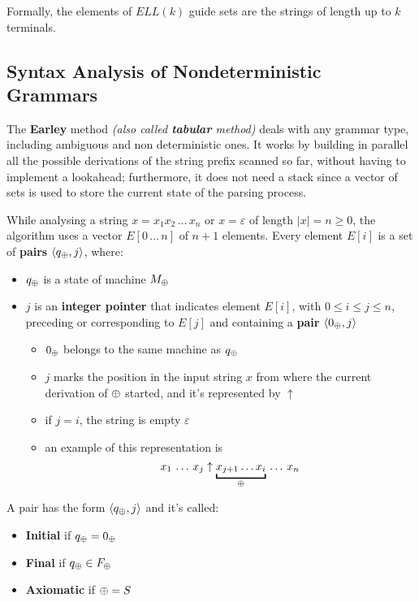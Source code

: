 \documentclass[english]{article}
\begin{document}
Formally, the elements of \(\textit{ELL}(k)\) guide sets are the strings of length up to \(k\) terminals.

\subsection{Syntax Analysis of Nondeterministic Grammars}

The \textbf{Earley} method \textit{(also called \textbf{tabular} method)} deals with any grammar type, including ambiguous and non deterministic ones.
It works by building in parallel all the possible derivations of the string prefix scanned so far, without having to implement a lookahead;
furthermore, it does not need a stack since a vector of sets is used to store the current state of the parsing process.

\bigskip
While analysing a string \(x = x_1 x_2 \,\ldots\, x_n\) or \(x = \varepsilon\) of length \(|x| = n \geq 0\), the algorithm uses a vector \(E\left[ 0 \,\ldots\, n \right]\) of \(n+1\) elements.
Every element \(E[i]\) is a set of \textbf{pairs} \(\langle q_\oplus, j\rangle\), where:

\begin{itemize}
  \item \(q_\oplus\) is a state of machine \(M_\oplus\)
  \item \(j\) is an \textbf{integer pointer} that indicates element \(E[i]\), with \(0 \leq i \leq j \leq n\), preceding or corresponding to \(E[j]\) and containing a \textbf{pair} \(\langle 0_\oplus, j \rangle\)
        \begin{itemize}
          \item \(0_\oplus\) belongs to the same machine as \(q_\oplus\)
          \item \(j\) marks the position in the input string \(x\) from where the current derivation of \(\oplus\) started, and it's represented by \(\uparrow\)
          \item if \(j = i\), the string is empty \(\varepsilon\)
          \item an example of this representation is \[ x_1 \,\ldots\, x_j \uparrow \underbracket{x_{j+1}\ldots x_i}_{\genericchar} \,\ldots\, x_n \]
        \end{itemize}
\end{itemize}

A pair has the form \(\langle q_\oplus, j \rangle\) and it's called:
\begin{itemize}
  \item \textbf{Initial} if \(q_\oplus = 0_\oplus\)
  \item \textbf{Final} if \(q_\oplus \in F_\oplus\)
  \item \textbf{Axiomatic} if \(\oplus = S\)
\end{itemize}
\end{document}
